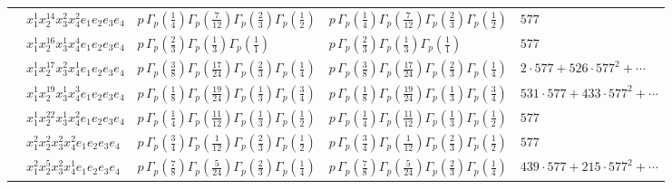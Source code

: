 \documentclass[11pt]{article}
\begin{document}
\begin{table}[ht]
{\begin{tabular}{@{}lllll@{}}
 & $x_{1}^{1} x_{2}^{14} x_{3}^{2} x_{4}^{2}  e_{1} e_{2} e_{3} e_{4}$ & $p \, \Gamma_p \left( \frac{1}{4} \right) \Gamma_p \left( \frac{7}{12} \right) \Gamma_p \left( \frac{2}{3} \right) \Gamma_p \left( \frac{1}{2} \right)$ & $p \, \Gamma_p \left( \frac{1}{4} \right) \Gamma_p \left( \frac{7}{12} \right) \Gamma_p \left( \frac{2}{3} \right) \Gamma_p \left( \frac{1}{2} \right)$ & $577$ \\
 & $x_{1}^{1} x_{2}^{16} x_{3}^{1} x_{4}^{4}  e_{1} e_{2} e_{3} e_{4}$ & $p \, \Gamma_p \left( \frac{2}{3} \right) \Gamma_p \left( \frac{1}{3} \right) \Gamma_p \left( \frac{1}{1} \right)$ & $p \, \Gamma_p \left( \frac{2}{3} \right) \Gamma_p \left( \frac{1}{3} \right) \Gamma_p \left( \frac{1}{1} \right)$ & $577$ \\
 & $x_{1}^{1} x_{2}^{17} x_{3}^{2} x_{4}^{1}  e_{1} e_{2} e_{3} e_{4}$ & $p \, \Gamma_p \left( \frac{3}{8} \right) \Gamma_p \left( \frac{17}{24} \right) \Gamma_p \left( \frac{2}{3} \right) \Gamma_p \left( \frac{1}{4} \right)$ & $p \, \Gamma_p \left( \frac{3}{8} \right) \Gamma_p \left( \frac{17}{24} \right) \Gamma_p \left( \frac{2}{3} \right) \Gamma_p \left( \frac{1}{4} \right)$ & $2{\cdot}577{+}526{\cdot}577^{2}{+}\cdots$ \\
 & $x_{1}^{1} x_{2}^{19} x_{3}^{1} x_{4}^{3}  e_{1} e_{2} e_{3} e_{4}$ & $p \, \Gamma_p \left( \frac{1}{8} \right) \Gamma_p \left( \frac{19}{24} \right) \Gamma_p \left( \frac{1}{3} \right) \Gamma_p \left( \frac{3}{4} \right)$ & $p \, \Gamma_p \left( \frac{1}{8} \right) \Gamma_p \left( \frac{19}{24} \right) \Gamma_p \left( \frac{1}{3} \right) \Gamma_p \left( \frac{3}{4} \right)$ & $531{\cdot}577{+}433{\cdot}577^{2}{+}\cdots$ \\
 & $x_{1}^{1} x_{2}^{22} x_{3}^{1} x_{4}^{2}  e_{1} e_{2} e_{3} e_{4}$ & $p \, \Gamma_p \left( \frac{1}{4} \right) \Gamma_p \left( \frac{11}{12} \right) \Gamma_p \left( \frac{1}{3} \right) \Gamma_p \left( \frac{1}{2} \right)$ & $p \, \Gamma_p \left( \frac{1}{4} \right) \Gamma_p \left( \frac{11}{12} \right) \Gamma_p \left( \frac{1}{3} \right) \Gamma_p \left( \frac{1}{2} \right)$ & $577$ \\
 & $x_{1}^{2} x_{2}^{2} x_{3}^{2} x_{4}^{2}  e_{1} e_{2} e_{3} e_{4}$ & $p \, \Gamma_p \left( \frac{3}{4} \right) \Gamma_p \left( \frac{1}{12} \right) \Gamma_p \left( \frac{2}{3} \right) \Gamma_p \left( \frac{1}{2} \right)$ & $p \, \Gamma_p \left( \frac{3}{4} \right) \Gamma_p \left( \frac{1}{12} \right) \Gamma_p \left( \frac{2}{3} \right) \Gamma_p \left( \frac{1}{2} \right)$ & $577$ \\
 & $x_{1}^{2} x_{2}^{5} x_{3}^{2} x_{4}^{1}  e_{1} e_{2} e_{3} e_{4}$ & $p \, \Gamma_p \left( \frac{7}{8} \right) \Gamma_p \left( \frac{5}{24} \right) \Gamma_p \left( \frac{2}{3} \right) \Gamma_p \left( \frac{1}{4} \right)$ & $p \, \Gamma_p \left( \frac{7}{8} \right) \Gamma_p \left( \frac{5}{24} \right) \Gamma_p \left( \frac{2}{3} \right) \Gamma_p \left( \frac{1}{4} \right)$ & $439{\cdot}577{+}215{\cdot}577^{2}{+}\cdots$ \\

\end{tabular}}
\end{table}
\end{document}
